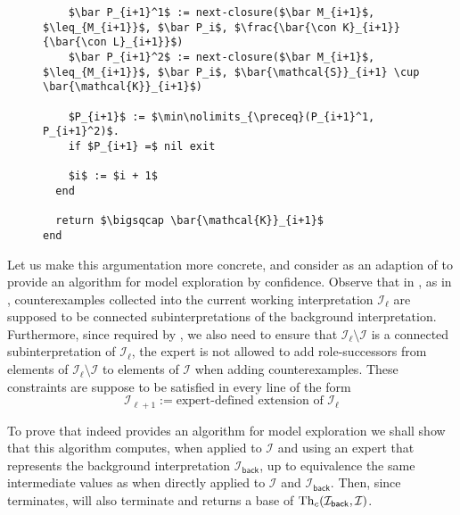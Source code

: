 \begin{figure}[tp]
\begin{Algorithm}
\begin{lstlisting}
    $\bar P_{i+1}^1$ := next-closure($\bar M_{i+1}$, $\leq_{M_{i+1}}$, $\bar P_i$, $\frac{\bar{\con K}_{i+1}}{\bar{\con L}_{i+1}}$)
    $\bar P_{i+1}^2$ := next-closure($\bar M_{i+1}$, $\leq_{M_{i+1}}$, $\bar P_i$, $\bar{\mathcal{S}}_{i+1} \cup \bar{\mathcal{K}}_{i+1}$)

    $P_{i+1}$ := $\min\nolimits_{\preceq}(P_{i+1}^1, P_{i+1}^2)$.
    if $P_{i+1} =$ nil exit

    $i$ := $i + 1$
  end

  return $\bigsqcap \bar{\mathcal{K}}_{i+1}$
end
    \end{lstlisting}
  \end{Algorithm}
\end{figure}

Let us make this argumentation more concrete, and consider
 as an adaption of
 to provide an algorithm for model
exploration by confidence.  Observe that in , as
in , counterexamples collected into the current working
interpretation $\mathcal{I}_{\ell}$ are supposed to be connected subinterpretations of the
background interpretation.  Furthermore, since required by
, we also need to ensure that
$\mathcal{I}_{\ell} \setminus \mathcal{I}$ is a connected subinterpretation of
$\mathcal{I}_{\ell}$, \ie the expert is not allowed to add role-successors from elements
of $\mathcal{I}_{\ell} \setminus \mathcal{I}$ to elements of $\mathcal{I}$ when adding
counterexamples.  These constraints are suppose to be satisfied in every line of the form
\begin{equation*}
  \mathcal{I}_{\ell+1} := \text{expert-defined extension of } \mathcal{I}_\ell
\end{equation*}

To prove that  indeed provides an algorithm for
model exploration we shall show that this algorithm computes, when applied to
$\mathcal{I}$ and using an expert that represents the background interpretation
$\mathcal{I}_{\mathsf{back}}$, up to equivalence the same intermediate values as
 when directly applied to $\mathcal{I}$ and
$\mathcal{I}_{\mathsf{back}}$.  Then, since 
terminates,  will also terminate and returns a
base of $\operatorname{Th}_{c}(\mathcal{I}_{\mathsf{back}}, \mathcal{I})$.

